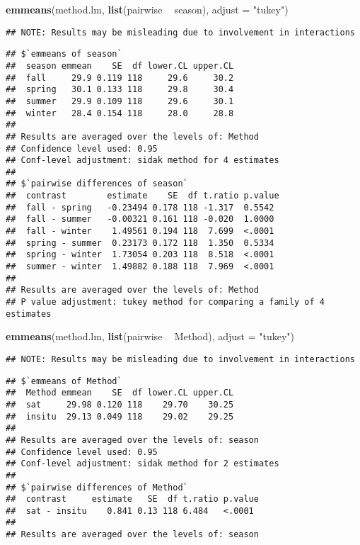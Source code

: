 \documentclass[
]{article}
\newenvironment{Shaded}{\begin{snugshade}}{\end{snugshade}}
\newcommand{\DataTypeTok}[1]{\textcolor[rgb]{0.13,0.29,0.53}{#1}}
\newcommand{\KeywordTok}[1]{\textcolor[rgb]{0.13,0.29,0.53}{\textbf{#1}}}
\newcommand{\NormalTok}[1]{#1}
\newcommand{\OperatorTok}[1]{\textcolor[rgb]{0.81,0.36,0.00}{\textbf{#1}}}
\newcommand{\StringTok}[1]{\textcolor[rgb]{0.31,0.60,0.02}{#1}}
\begin{document}
\begin{Shaded}
\begin{Highlighting}[]
\KeywordTok{emmeans}\NormalTok{(method.lm, }\KeywordTok{list}\NormalTok{(pairwise }\OperatorTok{~}\StringTok{ }\NormalTok{season), }\DataTypeTok{adjust =} \StringTok{"tukey"}\NormalTok{)}
\end{Highlighting}
\end{Shaded}

\begin{verbatim}
## NOTE: Results may be misleading due to involvement in interactions
\end{verbatim}

\begin{verbatim}
## $`emmeans of season`
##  season emmean    SE  df lower.CL upper.CL
##  fall     29.9 0.119 118     29.6     30.2
##  spring   30.1 0.133 118     29.8     30.4
##  summer   29.9 0.109 118     29.6     30.1
##  winter   28.4 0.154 118     28.0     28.8
## 
## Results are averaged over the levels of: Method 
## Confidence level used: 0.95 
## Conf-level adjustment: sidak method for 4 estimates 
## 
## $`pairwise differences of season`
##  contrast        estimate    SE  df t.ratio p.value
##  fall - spring   -0.23494 0.178 118 -1.317  0.5542 
##  fall - summer   -0.00321 0.161 118 -0.020  1.0000 
##  fall - winter    1.49561 0.194 118  7.699  <.0001 
##  spring - summer  0.23173 0.172 118  1.350  0.5334 
##  spring - winter  1.73054 0.203 118  8.518  <.0001 
##  summer - winter  1.49882 0.188 118  7.969  <.0001 
## 
## Results are averaged over the levels of: Method 
## P value adjustment: tukey method for comparing a family of 4 estimates
\end{verbatim}

\begin{Shaded}
\begin{Highlighting}[]
\KeywordTok{emmeans}\NormalTok{(method.lm, }\KeywordTok{list}\NormalTok{(pairwise }\OperatorTok{~}\StringTok{ }\NormalTok{Method), }\DataTypeTok{adjust =} \StringTok{"tukey"}\NormalTok{)}
\end{Highlighting}
\end{Shaded}

\begin{verbatim}
## NOTE: Results may be misleading due to involvement in interactions
\end{verbatim}

\begin{verbatim}
## $`emmeans of Method`
##  Method emmean    SE  df lower.CL upper.CL
##  sat     29.98 0.120 118    29.70    30.25
##  insitu  29.13 0.049 118    29.02    29.25
## 
## Results are averaged over the levels of: season 
## Confidence level used: 0.95 
## Conf-level adjustment: sidak method for 2 estimates 
## 
## $`pairwise differences of Method`
##  contrast     estimate   SE  df t.ratio p.value
##  sat - insitu    0.841 0.13 118 6.484   <.0001 
## 
## Results are averaged over the levels of: season
\end{verbatim}
\end{document}
